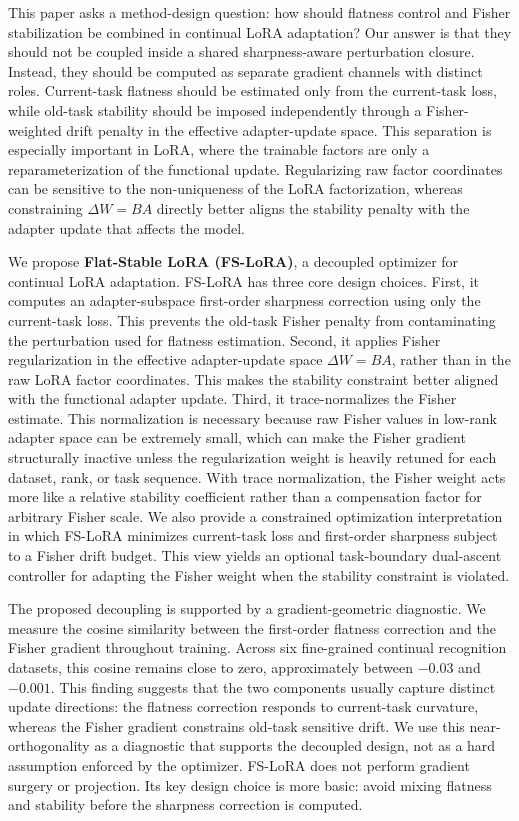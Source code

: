 This paper asks a method-design question: how should flatness control and Fisher stabilization be combined in continual LoRA adaptation?
Our answer is that they should not be coupled inside a shared sharpness-aware perturbation closure.
Instead, they should be computed as separate gradient channels with distinct roles.
Current-task flatness should be estimated only from the current-task loss, while old-task stability should be imposed independently through a Fisher-weighted drift penalty in the effective adapter-update space.
This separation is especially important in LoRA, where the trainable factors are only a reparameterization of the functional update.
Regularizing raw factor coordinates can be sensitive to the non-uniqueness of the LoRA factorization, whereas constraining $\Delta W=BA$ directly better aligns the stability penalty with the adapter update that affects the model.

We propose \textbf{Flat-Stable LoRA (FS-LoRA)}, a decoupled optimizer for continual LoRA adaptation.
FS-LoRA has three core design choices.
First, it computes an adapter-subspace first-order sharpness correction using only the current-task loss.
This prevents the old-task Fisher penalty from contaminating the perturbation used for flatness estimation.
Second, it applies Fisher regularization in the effective adapter-update space $\Delta W=BA$, rather than in the raw LoRA factor coordinates.
This makes the stability constraint better aligned with the functional adapter update.
Third, it trace-normalizes the Fisher estimate.
This normalization is necessary because raw Fisher values in low-rank adapter space can be extremely small, which can make the Fisher gradient structurally inactive unless the regularization weight is heavily retuned for each dataset, rank, or task sequence.
With trace normalization, the Fisher weight acts more like a relative stability coefficient rather than a compensation factor for arbitrary Fisher scale.
We also provide a constrained optimization interpretation in which FS-LoRA minimizes current-task loss and first-order sharpness subject to a Fisher drift budget.
This view yields an optional task-boundary dual-ascent controller for adapting the Fisher weight when the stability constraint is violated.

The proposed decoupling is supported by a gradient-geometric diagnostic.
We measure the cosine similarity between the first-order flatness correction and the Fisher gradient throughout training.
Across six fine-grained continual recognition datasets, this cosine remains close to zero, approximately between $-0.03$ and $-0.001$.
This finding suggests that the two components usually capture distinct update directions: the flatness correction responds to current-task curvature, whereas the Fisher gradient constrains old-task sensitive drift.
We use this near-orthogonality as a diagnostic that supports the decoupled design, not as a hard assumption enforced by the optimizer.
FS-LoRA does not perform gradient surgery or projection.
Its key design choice is more basic: avoid mixing flatness and stability before the sharpness correction is computed.

